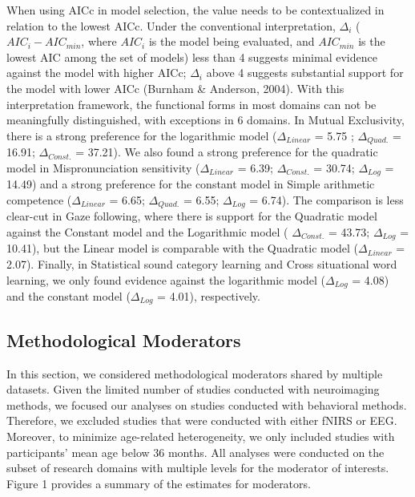 \documentclass[10pt, letterpaper]{article}
\begin{document}
When using AICc in model selection, the value needs to be contextualized
in relation to the lowest AICc. Under the conventional interpretation,
\(\Delta_{i}\) (\(AIC_i - AIC_{min}\), where \(AIC_i\) is the model
being evaluated, and \(AIC_{min}\) is the lowest AIC among the set of
models) less than 4 suggests minimal evidence against the model with
higher AICc; \(\Delta_{i}\) above 4 suggests substantial support for the
model with lower AICc (Burnham \& Anderson, 2004). With this
interpretation framework, the functional forms in most domains can not
be meaningfully distinguished, with exceptions in 6 domains. In Mutual
Exclusivity, there is a strong preference for the logarithmic model
(\(\Delta_{Linear}\) = 5.75 ; \(\Delta_{Quad.}\) = 16.91;
\(\Delta_{Const.}\) = 37.21). We also found a strong preference for the
quadratic model in Mispronunciation sensitivity (\(\Delta_{Linear}\) =
6.39; \(\Delta_{Const.}\) = 30.74; \(\Delta_{Log}\) = 14.49) and a
strong preference for the constant model in Simple arithmetic competence
(\(\Delta_{Linear}\) = 6.65; \(\Delta_{Quad.}\) = 6.55; \(\Delta_{Log}\)
= 6.74). The comparison is less clear-cut in Gaze following, where there
is support for the Quadratic model against the Constant model and the
Logarithmic model ( \(\Delta_{Const.}\) = 43.73; \(\Delta_{Log}\) =
10.41), but the Linear model is comparable with the Quadratic model
(\(\Delta_{Linear}\) = 2.07). Finally, in Statistical sound category
learning and Cross situational word learning, we only found evidence
against the logarithmic model (\(\Delta_{Log}\) = 4.08) and the constant
model (\(\Delta_{Log}\) = 4.01), respectively.

\hypertarget{methodological-moderators}{%
\subsection{Methodological Moderators}\label{methodological-moderators}}

In this section, we considered methodological moderators shared by
multiple datasets. Given the limited number of studies conducted with
neuroimaging methods, we focused our analyses on studies conducted with
behavioral methods. Therefore, we excluded studies that were conducted
with either fNIRS or EEG. Moreover, to minimize age-related
heterogeneity, we only included studies with participants' mean age
below 36 months. All analyses were conducted on the subset of research
domains with multiple levels for the moderator of interests. Figure 1
provides a summary of the estimates for moderators.
\end{document}
